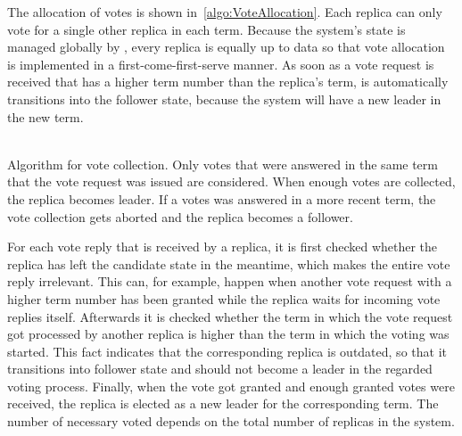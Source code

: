 The allocation of votes is shown in~\autoref{algo:VoteAllocation}.
Each replica can only vote for a single other replica in each term.
Because the system's state is managed globally by , every replica is equally up to data so that vote allocation is implemented in a first-come-first-serve manner.
As soon as a vote request is received that has a higher term number than the replica's term, is automatically transitions into the follower state, because the system will have a new leader in the new term.
\\\\
\begin{algorithm}[H]\caption{Algorithm for vote collection. Only votes that were answered in the same term that the vote request was issued are considered. When enough votes are collected, the replica becomes leader. If a votes was answered in a more recent term, the vote collection gets aborted and the replica becomes a follower.}\label{algo:VoteCollection}

\BlankLine

\end{algorithm}

For each vote reply that is received by a replica, it is first checked whether the replica has left the candidate state in the meantime, which makes the entire vote reply irrelevant.
This can, for example, happen when another vote request with a higher term number has been granted while the replica waits for incoming vote replies itself.
Afterwards it is checked whether the term in which the vote request got processed by another replica is higher than the term in which the voting was started.
This fact indicates that the corresponding replica is outdated, so that it transitions into follower state and should not become a leader in the regarded voting process.
Finally, when the vote got granted and enough granted votes were received, the replica is elected as a new leader for the corresponding term.
The number of necessary voted depends on the total number of replicas in the system.

